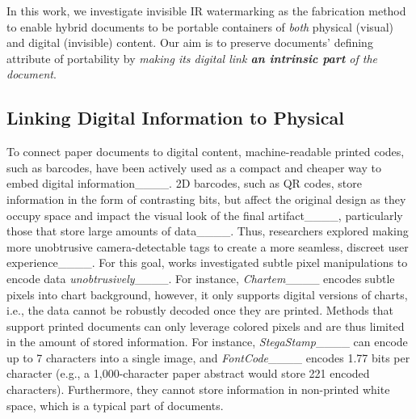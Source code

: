 In this work, we investigate invisible IR watermarking as the fabrication method to enable hybrid documents to be portable containers of \textit{both} physical (visual) and digital (invisible) content. Our aim is to preserve documents' defining attribute of portability by \textit{making its digital link \textbf{an intrinsic part} of the document}.









\subsection{Linking Digital Information to Physical}


To connect paper documents to digital content, machine-readable printed codes, such as barcodes, have been actively used as a compact and cheaper way to embed digital information____. 
2D barcodes, such as QR codes, store information in the form of contrasting bits, but affect the original design as they occupy space and impact the visual look of the final artifact____, particularly those that store large amounts of data____. 
Thus, researchers explored making more unobtrusive camera-detectable tags to create a more seamless, discreet user experience____.
For this goal, works investigated subtle pixel manipulations to encode data \textit{unobtrusively}____.
For instance, \textit{Chartem}____ encodes subtle pixels into chart background, %
however, it only supports digital versions of charts, i.e., the data cannot be robustly decoded once they are printed.
Methods that support printed documents can only leverage colored pixels and are thus limited in the amount of stored information. %
For instance, \textit{StegaStamp}____ can encode up to 7 characters into a single image, and \textit{FontCode}____  encodes 1.77 bits per character (e.g., a 1,000-character paper abstract would store 221 encoded characters).
Furthermore, they cannot store information in non-printed white space, which is a typical part of documents.



